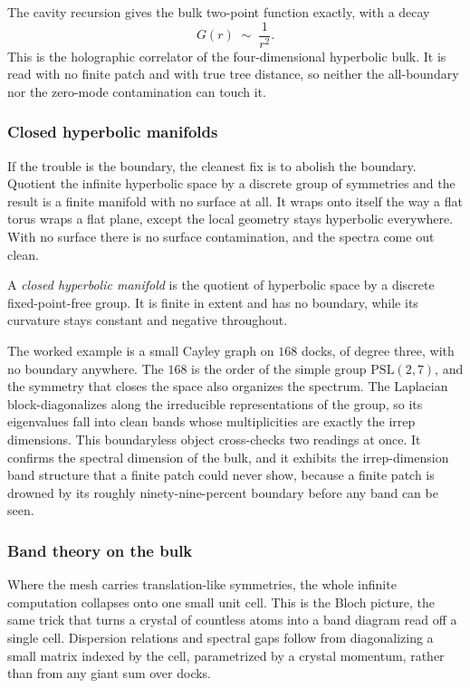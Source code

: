 \begin{result}
The cavity recursion gives the bulk two-point function exactly, with a decay
\[
G(r) \;\sim\; \frac{1}{r^2}.
\]
This is the holographic correlator of the four-dimensional hyperbolic bulk. It is read with no finite patch and with true tree distance, so neither the all-boundary nor the zero-mode contamination can touch it.
\end{result}

\subsubsection{Closed hyperbolic manifolds}

If the trouble is the boundary, the cleanest fix is to abolish the boundary. Quotient the infinite hyperbolic space by a discrete group of symmetries and the result is a finite manifold with no surface at all. It wraps onto itself the way a flat torus wraps a flat plane, except the local geometry stays hyperbolic everywhere. With no surface there is no surface contamination, and the spectra come out clean.

\begin{definition}
A \emph{closed hyperbolic manifold} is the quotient of hyperbolic space by a discrete fixed-point-free group. It is finite in extent and has no boundary, while its curvature stays constant and negative throughout.
\end{definition}

The worked example is a small Cayley graph on $168$ docks, of degree three, with no boundary anywhere. The $168$ is the order of the simple group $\mathrm{PSL}(2,7)$, and the symmetry that closes the space also organizes the spectrum. The Laplacian block-diagonalizes along the irreducible representations of the group, so its eigenvalues fall into clean bands whose multiplicities are exactly the irrep dimensions. This boundaryless object cross-checks two readings at once. It confirms the spectral dimension of the bulk, and it exhibits the irrep-dimension band structure that a finite patch could never show, because a finite patch is drowned by its roughly ninety-nine-percent boundary before any band can be seen.

\subsubsection{Band theory on the bulk}

Where the mesh carries translation-like symmetries, the whole infinite computation collapses onto one small unit cell. This is the Bloch picture, the same trick that turns a crystal of countless atoms into a band diagram read off a single cell. Dispersion relations and spectral gaps follow from diagonalizing a small matrix indexed by the cell, parametrized by a crystal momentum, rather than from any giant sum over docks.


